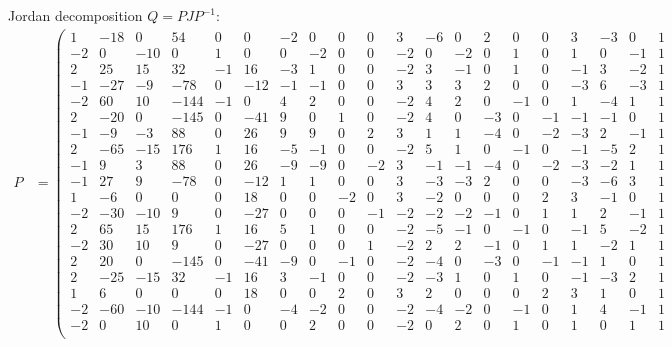 \documentclass{article}
\theoremstyle{plain}
\theoremstyle{definition}
\begin{document}
Jordan decomposition $Q = P J P^{-1}$:
\begin{align}
	P &=
	\left(
	\begin{smallmatrix}
		1 & -18 & 0 & 54 & 0 & 0 & -2 & 0 & 0 & 0 & 3 & -6 & 0 & 2 & 0 & 0 & 3 & -3 & 0 & 1 \\
		-2 & 0 & -10 & 0 & 1 & 0 & 0 & -2 & 0 & 0 & -2 & 0 & -2 & 0 & 1 & 0 & 1 & 0 & -1 & 1 \\
		2 & 25 & 15 & 32 & -1 & 16 & -3 & 1 & 0 & 0 & -2 & 3 & -1 & 0 & 1 & 0 & -1 & 3 & -2 & 1 \\
		-1 & -27 & -9 & -78 & 0 & -12 & -1 & -1 & 0 & 0 & 3 & 3 & 3 & 2 & 0 & 0 & -3 & 6 & -3 & 1 \\
		-2 & 60 & 10 & -144 & -1 & 0 & 4 & 2 & 0 & 0 & -2 & 4 & 2 & 0 & -1 & 0 & 1 & -4 & 1 & 1 \\
		2 & -20 & 0 & -145 & 0 & -41 & 9 & 0 & 1 & 0 & -2 & 4 & 0 & -3 & 0 & -1 & -1 & -1 & 0 & 1 \\
		-1 & -9 & -3 & 88 & 0 & 26 & 9 & 9 & 0 & 2 & 3 & 1 & 1 & -4 & 0 & -2 & -3 & 2 & -1 & 1 \\
		2 & -65 & -15 & 176 & 1 & 16 & -5 & -1 & 0 & 0 & -2 & 5 & 1 & 0 & -1 & 0 & -1 & -5 & 2 & 1 \\
		-1 & 9 & 3 & 88 & 0 & 26 & -9 & -9 & 0 & -2 & 3 & -1 & -1 & -4 & 0 & -2 & -3 & -2 & 1 & 1 \\
		-1 & 27 & 9 & -78 & 0 & -12 & 1 & 1 & 0 & 0 & 3 & -3 & -3 & 2 & 0 & 0 & -3 & -6 & 3 & 1 \\
		1 & -6 & 0 & 0 & 0 & 18 & 0 & 0 & -2 & 0 & 3 & -2 & 0 & 0 & 0 & 2 & 3 & -1 & 0 & 1 \\
		-2 & -30 & -10 & 9 & 0 & -27 & 0 & 0 & 0 & -1 & -2 & -2 & -2 & -1 & 0 & 1 & 1 & 2 & -1 & 1 \\
		2 & 65 & 15 & 176 & 1 & 16 & 5 & 1 & 0 & 0 & -2 & -5 & -1 & 0 & -1 & 0 & -1 & 5 & -2 & 1 \\
		-2 & 30 & 10 & 9 & 0 & -27 & 0 & 0 & 0 & 1 & -2 & 2 & 2 & -1 & 0 & 1 & 1 & -2 & 1 & 1 \\
		2 & 20 & 0 & -145 & 0 & -41 & -9 & 0 & -1 & 0 & -2 & -4 & 0 & -3 & 0 & -1 & -1 & 1 & 0 & 1 \\
		2 & -25 & -15 & 32 & -1 & 16 & 3 & -1 & 0 & 0 & -2 & -3 & 1 & 0 & 1 & 0 & -1 & -3 & 2 & 1 \\
		1 & 6 & 0 & 0 & 0 & 18 & 0 & 0 & 2 & 0 & 3 & 2 & 0 & 0 & 0 & 2 & 3 & 1 & 0 & 1 \\
		-2 & -60 & -10 & -144 & -1 & 0 & -4 & -2 & 0 & 0 & -2 & -4 & -2 & 0 & -1 & 0 & 1 & 4 & -1 & 1 \\
		-2 & 0 & 10 & 0 & 1 & 0 & 0 & 2 & 0 & 0 & -2 & 0 & 2 & 0 & 1 & 0 & 1 & 0 & 1 & 1 \\

\end{smallmatrix}
\end{align}
\end{document}
